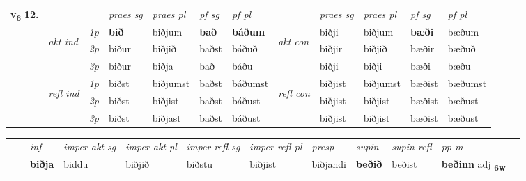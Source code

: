 \begin{tabular}{llllllllllll} \toprule
\multirow{4}{*}{{{\textbf{v{\textsubscript{6}}} \Large{\textbf{12.}}}}}  & &   &  \textit{praes sg}  & \textit{praes pl}  &\textit{ pf sg} & \textit{pf pl} &  &  \textit{praes sg}  & \textit{praes pl}  & \textit{pf sg} & \textit{pf pl } \\*
	\cmidrule{4-7} \cmidrule{9-12}
 & \multirow{3}{*}{\begin{turn}{90}\textit{akt ind}\end{turn}} & {\textit{1p}} & \textbf{bið} & biðjum    & \textbf{bað} & \textbf{báðum} & \multirow{3}{*}{\begin{turn}{90}\textit{akt con}\end{turn}} &biðji & biðjum & \textbf{bæði} & bæðum\\*
& &  {\textit{2p}} &  biður  & biðjið   & baðst & báðuð & & biðjir & biðjið & bæðir & bæðuð \\*
& &  {\textit{3p}} & biður & biðja   & bað & báðu & & biðji & biðji& bæði & bæðu  \\*
\cmidrule{4-7} \cmidrule{9-12}
 &\multirow{3}{*}{\begin{turn}{90}\textit{refl ind}\end{turn}} & {\textit{1p}} & biðst & biðjumst    & baðst & báðumst & \multirow{3}{*}{\begin{turn}{90}\textit{refl con}\end{turn}}  &biðjist & biðjumst & bæðist & bæðumst\\*
 &&  {\textit{2p}} &  biðst  & biðjist   & baðst & báðust & &biðjist & biðjist & bæðist & bæðust \\*
& &  {\textit{3p}} & biðst & biðjast   & baðst & báðust & & biðjist & biðjist& bæðist & bæðust  \\*
\cmidrule{4-7} \cmidrule{9-12}
\end{tabular}


\begin{tabular}{llllllllllll}
 & & \textit{inf} & \textit{imper akt sg} & \textit{imper akt pl} & \textit{imper refl sg} & \textit{imper refl pl} & \textit{presp} & \textit{supin} & \textit{supin refl} & \textit{pp m}     \\*
  & & \textbf{biðja} & biddu  & biðjið & biðstu & biðjist & biðjandi &  \textbf{beðið} & beðist & \textbf{beðinn} adj \textbf{\textsubscript{6w}} \\*
\cmidrule{1-12}
\end{tabular}




